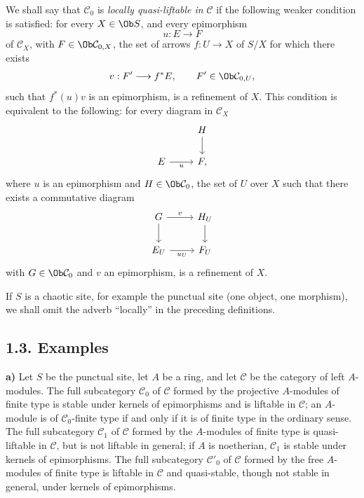 We shall say that \(\mathcal C_0\) is \emph{locally quasi-liftable in} \(\mathcal C\) if the following weaker condition is satisfied: for every \(X\in\Ob S\), and every epimorphism
\[
  u:E\longrightarrow F
\]
of \(\mathcal C_X\), with \(F\in\Ob\mathcal C_{0,X}\), the set of arrows \(f:U\to X\) of \(S/X\) for which there exists
\[
  v:F'\longrightarrow f^*E,\qquad F'\in\Ob\mathcal C_{0,U},
\]
such that \(f^*(u)v\) is an epimorphism, is a refinement of \(X\). This condition is equivalent to the following: for every diagram in \(\mathcal C_X\)
\[
\begin{tikzcd}
& H \arrow[d]\\
E \arrow[r,"u"'] & F ,
\end{tikzcd}
\]
where \(u\) is an epimorphism and \(H\in\Ob\mathcal C_0\), the set of \(U\) over \(X\) such that there exists a commutative diagram
\[
\begin{tikzcd}
G \arrow[r,"v"] \arrow[d] & H_U \arrow[d]\\
E_U \arrow[r,"u_U"'] & F_U
\end{tikzcd}
\]
with \(G\in\Ob\mathcal C_0\) and \(v\) an epimorphism, is a refinement of \(X\).

If \(S\) is a chaotic site, for example the punctual site (one object, one morphism), we shall omit the adverb ``locally'' in the preceding definitions.

\subsection*{1.3. Examples}

\textbf{a)} Let \(S\) be the punctual site, let \(A\) be a ring, and let \(\mathcal C\) be the category of left \(A\)-modules. The full subcategory \(\mathcal C_0\) of \(\mathcal C\) formed by the projective \(A\)-modules of finite type is stable under kernels of epimorphisms and is liftable in \(\mathcal C\); an \(A\)-module is of \(\mathcal C_0\)-finite type if and only if it is of finite type in the ordinary sense. The full subcategory \(\mathcal C_1\) of \(\mathcal C\) formed by the \(A\)-modules of finite type is quasi-liftable in \(\mathcal C\), but is not liftable in general; if \(A\) is noetherian, \(\mathcal C_1\) is stable under kernels of epimorphisms. The full subcategory \(\mathcal C'_0\) of \(\mathcal C\) formed by the free \(A\)-modules of finite type is liftable in \(\mathcal C\) and quasi-stable, though not stable in general, under kernels of epimorphisms.

